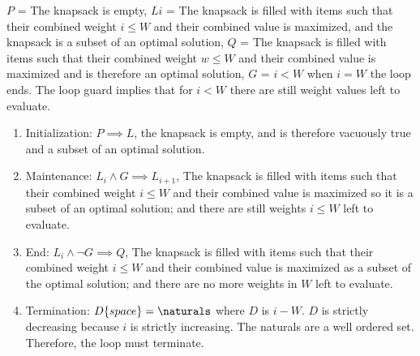 \documentclass{article}
\begin{document}
\begin{enumerate}
$P$ = The knapsack is empty, $Li$ = The knapsack is filled with items such that their combined weight $i \leq W$ and their combined value is maximized,
and the knapsack is a subset of an optimal solution, $Q$ = The knapsack is filled with items such that their combined weight $w \leq W$ and their combined value is maximized and is therefore an optimal solution,
$G$ = $i < W$ when $i = W$ the loop ends. The loop guard implies that for $i < W$ there are still weight values left to evaluate.
\begin{enumerate}
\item Initialization: $P \implies L$, the knapsack is empty, and is therefore vacuously true and a subset of an optimal solution.
\item Maintenance: $L_{i} \land G \implies L_{i+1}$, The knapsack is filled with items such that their combined weight $i \leq W$ and their combined value is maximized so it is a subset of an optimal solution;
and there are still weights $i \leq W$ left to evaluate.
\item End: $L_{i} \land \neg G \implies Q$, The knapsack is filled with items such that their combined weight $i \leq W$ and their combined value is maximized as a subset of the optimal solution;
and there are no more weights in $W$ left to evaluate.
\item Termination: $D\{space\} = \naturals$ where $D$ is $i - W$. $D$ is strictly decreasing because $i$ is strictly increasing.
The naturals are a well ordered set. Therefore, the loop must terminate.
\end{enumerate}

\end{enumerate}
\end{document}
